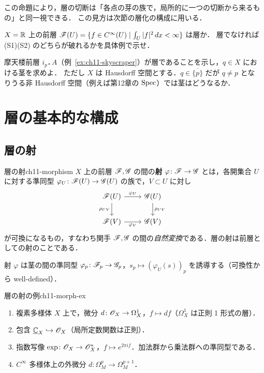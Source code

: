 この命題により，層の切断は「各点の芽の族で，局所的に一つの切断から来るもの」と同一視できる．
この見方は次節の層化の構成に用いる．

$X=\mathbb{R}$ 上の前層 $\mathscr{F}(U)=\{f\in C^\infty(U)\mid \int_U |f|^2\,dx<\infty\}$ は層か．
層でなければ (S1)(S2) のどちらが破れるかを具体例で示せ．

摩天楼前層 $i_{p*}A$（例~\ref{ex:ch11-skyscraper}）が層であることを示し，$q\in X$ における茎を求めよ．
ただし $X$ は Hausdorff 空間とする．$q\in\overline{\{p\}}$ だが $q\ne p$ となりうる非 Hausdorff 空間（例えば第12章の $\operatorname{Spec}$）では茎はどうなるか．

\section{層の基本的な構成}

\subsection{層の射}

\begin{mydef}{層の射}{ch11-morphism}
$X$ 上の前層 $\mathscr{F},\mathscr{G}$ の間の\textbf{射} $\varphi\colon\mathscr{F}\to\mathscr{G}$ とは，各開集合 $U$ に対する準同型 $\varphi_U\colon\mathscr{F}(U)\to\mathscr{G}(U)$ の族で，$V\subset U$ に対し
\[
\begin{tikzcd}
  \sheaf{F}(U) \arrow[r,"\varphi_U"] \arrow[d,"\rho_{UV}"'] & \sheaf{G}(U) \arrow[d,"\rho_{UV}"] \\
  \sheaf{F}(V) \arrow[r,"\varphi_V"'] & \sheaf{G}(V)
\end{tikzcd}
\]
が可換になるもの，すなわち関手 $\mathscr{F},\mathscr{G}$ の間の\emph{自然変換}である．層の射は前層としての射のことである．
\end{mydef}

射 $\varphi$ は茎の間の準同型 $\varphi_p\colon\mathscr{F}_p\to\mathscr{G}_p$，$s_p\mapsto(\varphi_U(s))_p$ を誘導する（可換性から well-defined）．

\begin{myex}{層の射の例}{ch11-morph-ex}
\begin{enumerate}
  \item 複素多様体 $X$ 上で，微分 $d\colon \mathscr{O}_X\to\Omega^1_X$，$f\mapsto df$（$\Omega^1_X$ は正則 1 形式の層）．
  \item 包含 $\underline{\mathbb{C}}_X\hookrightarrow\mathscr{O}_X$（局所定数関数は正則）．
  \item 指数写像 $\exp\colon\mathscr{O}_X\to\mathscr{O}_X^*$，$f\mapsto e^{2\pi i f}$．加法群から乗法群への準同型である．
  \item $C^\infty$ 多様体上の外微分 $d\colon\Omega^p_M\to\Omega^{p+1}_M$．
\end{enumerate}
\end{myex}

